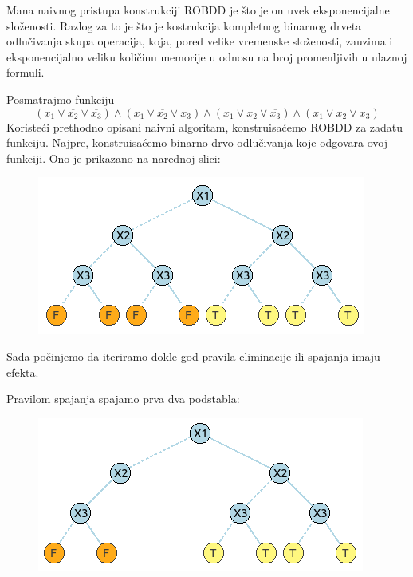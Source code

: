 Mana naivnog pristupa konstrukciji ROBDD je \v{s}to je on uvek eksponencijalne slo\v{z}enosti. Razlog za to je \v{s}to je kostrukcija kompletnog binarnog drveta odlu\v{c}ivanja skupa operacija, koja, pored velike vremenske slo\v{z}enosti, zauzima i eksponencijalno veliku koli\v{c}inu memorije u odnosu na broj promenljivih u ulaznoj formuli.

\begin{exmp}
    Posmatrajmo funkciju
    $$(x_{1} \vee \overline{x_{2}} \vee \overline{x_{3}}) \wedge (x_{1} \vee \overline{x_{2}} \vee x_{3}) \wedge (x_{1} \vee x_{2} \vee \overline{x_{3}}) \wedge (x_{1} \vee x_{2} \vee x_{3})$$
    Koriste\'c{}i prethodno opisani naivni algoritam, konstruisa\'c{}emo ROBDD za zadatu funkciju.
    Najpre, konstruisa\'c{}emo binarno drvo odlu\v{c}ivanja koje odgovara ovoj funkciji. Ono je prikazano na narednoj slici:
    
    \begin{figure}[H]
        \centering
        \includegraphics{slike/primer/00.png}
    \end{figure}
    
    Sada po\v{c}injemo da iteriramo dokle god pravila eliminacije ili spajanja imaju efekta.
    
    Pravilom spajanja spajamo prva dva podstabla:
    
    \begin{figure}[H]
        \centering
        \includegraphics{slike/primer/01.png}
    \end{figure}
    

\end{exmp}
